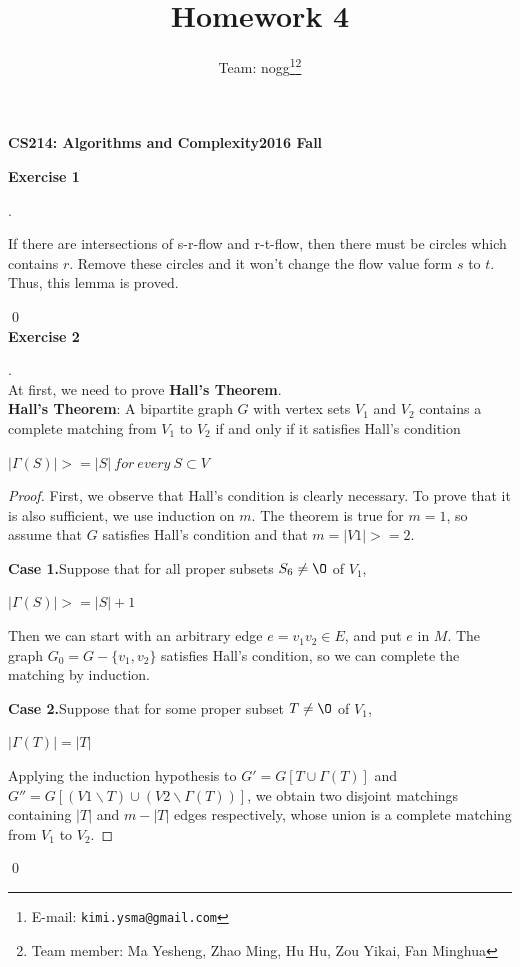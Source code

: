\documentclass[12pt, notitlepage]{article}
\title{Homework 4}
\author{Team: nogg\footnote{E-mail: \texttt{kimi.ysma@gmail.com}}\footnote{Team member: Ma Yesheng, Zhao Ming, Hu Hu, Zou Yikai, Fan Minghua}}
\newenvironment{sol}
  {\par\vspace{3mm}\noindent{\it Solution}.}{\qed}
\begin{document}
{\bf\small CS214: Algorithms and Complexity}\hfill{\bf\small 2016 Fall}
{\let\newpage\relax\maketitle}

\textbf{Exercise 1}
\begin{sol}
	
\qquad If there are intersections of s-r-flow and r-t-flow, then there must be circles which contains $r$. Remove these circles and it won't change the flow value form $s$ to $t$. Thus, this lemma is proved. 

\end{sol}\\

\textbf{Exercise 2}
\begin{sol}\\
At first, we need to prove \textbf{Hall's Theorem}.\\
\textbf{Hall's Theorem}: A bipartite graph $G$ with vertex sets $V_1$ and $V_2$ contains a complete matching
from $V_1$ to $V_2$ if and only if it satisfies Hall's condition\\
\centerline{$|\Gamma (S)| >= |S|\ for\ every\ S \subset V$}
\begin{proof}
First, we observe that Hall’s condition is clearly necessary. To prove that it is also sufficient, we use induction on $m$. The theorem is true for $m = 1$, so assume that $G$ satisfies Hall’s condition and that $m = |V1| >= 2$.

\qquad \textbf{Case 1.}Suppose that for all proper subsets $S _6 \neq \O$ of $V_1$,\\
\centerline{$|\Gamma(S)| >= |S| + 1$}
Then we can start with an arbitrary edge $e = v_1v_2 \in E$, and put $e$ in $M$. The graph $G_0 = G- \{v_1, v_2\}$ satisfies Hall’s condition, so we can complete the matching by induction.

\qquad \textbf{Case 2.}Suppose that for some proper subset $T \neq \O$ of $V_1$,\\
\centerline{$|\Gamma (T)| = |T|$}
Applying the induction hypothesis to $G' = G[T \cup \Gamma (T)]$ and $G'' = G[(V1 \backslash T) \cup (V2 \backslash \Gamma (T))]$, we obtain two disjoint matchings containing $|T|$ and $m-|T|$ edges respectively, whose union is a complete matching from $V_1$ to $V_2$.
\end{proof}


\end{sol}
\end{document}
